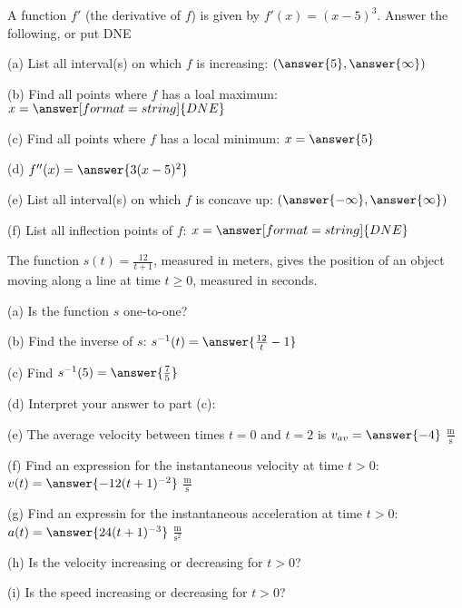 \documentclass{ximera}
\begin{document}
\begin{exercise}
A function $f'$ (the derivative of $f$) is given by $f'(x)=(x-5)^3$. Answer the following, or put DNE

(a) List all interval(s) on which $f$ is increasing: $(\answer{5},\answer{\infty})$

(b) Find all points where $f$ has a loal maximum: $x=\answer[format=string]{DNE}$

(c) Find all points where $f$ has a local minimum: $x=\answer{5}$

(d) $f''(x)=\answer{3(x-5)^2}$

(e) List all interval(s) on which $f$ is concave up: $(\answer{-\infty},\answer{\infty})$

(f) List all inflection points of $f$: $x=\answer[format=string]{DNE}$

\end{exercise}

\begin{exercise}
The function $s(t)=\frac{12}{t+1}$, measured in meters, gives the position of an object moving along a line at time $t\geq 0$, measured in seconds.

(a) Is the function $s$ one-to-one? 
\begin{multipleChoice}
\end{multipleChoice}

(b) Find the inverse of $s$: $s^{-1}(t)=\answer{\frac{12}{t}-1}$

(c) Find $s^{-1}(5)=\answer{\frac{7}{5}}$

(d) Interpret your answer to part (c):
\begin{multipleChoice}
\end{multipleChoice}

(e) The average velocity between times $t=0$ and $t=2$ is $v_{av}=\answer{-4}$ $\frac{\text{m}}{\text{s}}$

(f) Find an expression for the instantaneous velocity at time $t>0$: $v(t)=\answer{-12(t+1)^{-2}}$ $\frac{\text{m}}{\text{s}}$

(g) Find an expressin for the instantaneous acceleration at time $t>0$: $a(t)=\answer{24(t+1)^{-3}}$ $\frac{\text{m}}{\text{s}^2}$

(h) Is the velocity increasing or decreasing for $t>0$?
\begin{multipleChoice}
\end{multipleChoice}

(i) Is the speed increasing or decreasing for $t>0$?
\begin{multipleChoice}
\end{multipleChoice}
\end{exercise}
\end{document}
